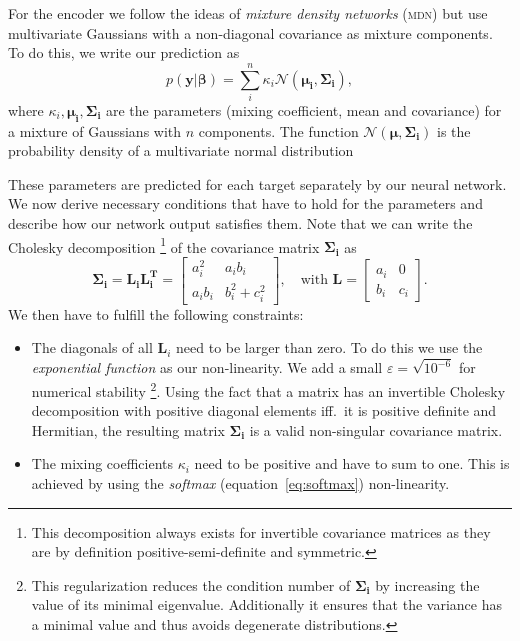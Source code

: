 \documentclass[nobib, a4paper]{tufte-handout}
\begin{document}
For the encoder we follow the ideas of \textit{mixture density networks} (\textsc{mdn}) but use multivariate Gaussians with a non-diagonal covariance as mixture components\autocite{mdn}.
To do this, we write our prediction as
\begin{equation*}
p \left( \bm{y} | \bm{\beta} \right) = \sum_{i}^n \kappa_i \mathcal{N} \left( \bm{\mu_i}, \bm{\Sigma_i} \right),
\end{equation*}
where \(\kappa_i, \bm{\mu_i}, \bm{\Sigma_i}\) are the parameters (mixing coefficient, mean and covariance) for a mixture of Gaussians with \(n\) components.
The function \(\mathcal{N}(\bm{\mu}, \bm{\Sigma_i})\) is the probability density of a multivariate normal distribution 

These parameters are predicted for each target separately by our neural network.
We now derive necessary conditions that have to hold for the parameters and describe how our network output satisfies them.
Note that we can write the Cholesky decomposition%
\footnote{This decomposition always exists for invertible covariance matrices as they are by definition positive-semi-definite and symmetric.}
of the covariance matrix \(\bm{\Sigma_i}\) as
\begin{equation*}
  \bm{\Sigma_i} = \bm{L_i} \bm{L_i^T} =
  \begin{bmatrix}
    a_i^2 & a_ib_i \\
    a_ib_i & b_i^2 + c_i^2
  \end{bmatrix} ,\quad
   \text{with } \bm{L} =
   \begin{bmatrix}
     a_i & 0 \\
     b_i & c_i
   \end{bmatrix}.
\end{equation*}
We then have to fulfill the following constraints:
\begin{itemize}
\item The diagonals of all \(\bm{L}_i\) need to be larger than zero.
  To do this we use the \textit{exponential function} as our non-linearity.
  We add a small \(\varepsilon = \sqrt{10^{-6}}\) for numerical stability%
  \footnote{This regularization reduces the condition number of \(\bm{\Sigma_i}\) by increasing the value of its minimal eigenvalue.
  Additionally it ensures that the variance has a minimal value and thus avoids degenerate distributions.}. %
  Using the fact that a matrix has an invertible Cholesky decomposition with positive diagonal elements iff.\ it is positive definite and Hermitian,
  the resulting matrix \(\bm{\Sigma_i}\) is a valid non-singular covariance matrix.
\item The mixing coefficients \(\kappa_i\) need to be positive and have to sum to one.
  This is achieved by using the \textit{softmax} (equation~\ref{eq:softmax}) non-linearity.

\end{itemize}
\end{document}

